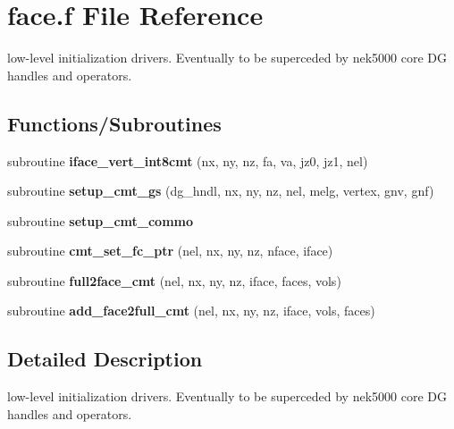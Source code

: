 \hypertarget{face_8f}{\section{face.\-f File Reference}
\label{face_8f}
}


low-\/level initialization drivers. Eventually to be superceded by nek5000 core D\-G handles and operators.  


\subsection*{Functions/\-Subroutines}
\begin{DoxyCompactItemize}
\item 
\hypertarget{face_8f_a8efaf08cb6f5e3f2d453dc8195fdedc3}{subroutine {\bfseries iface\-\_\-vert\-\_\-int8cmt} (nx, ny, nz, fa, va, jz0, jz1, nel)}\label{face_8f_a8efaf08cb6f5e3f2d453dc8195fdedc3}

\item 
\hypertarget{face_8f_ac6a7aef7d985d0dbcfccfca53c4c7fc2}{subroutine {\bfseries setup\-\_\-cmt\-\_\-gs} (dg\-\_\-hndl, nx, ny, nz, nel, melg, vertex, gnv, gnf)}\label{face_8f_ac6a7aef7d985d0dbcfccfca53c4c7fc2}

\item 
\hypertarget{face_8f_a7030c76781d497bc17d369a40670ef59}{subroutine {\bfseries setup\-\_\-cmt\-\_\-commo}}\label{face_8f_a7030c76781d497bc17d369a40670ef59}

\item 
\hypertarget{face_8f_ab10a3afa8911c08464a660346cad3c5a}{subroutine {\bfseries cmt\-\_\-set\-\_\-fc\-\_\-ptr} (nel, nx, ny, nz, nface, iface)}\label{face_8f_ab10a3afa8911c08464a660346cad3c5a}

\item 
\hypertarget{face_8f_a250af663ab54c8e8777f671b93c6c4ac}{subroutine {\bfseries full2face\-\_\-cmt} (nel, nx, ny, nz, iface, faces, vols)}\label{face_8f_a250af663ab54c8e8777f671b93c6c4ac}

\item 
\hypertarget{face_8f_a8837dacbadf0fe4f899f2768bb606deb}{subroutine {\bfseries add\-\_\-face2full\-\_\-cmt} (nel, nx, ny, nz, iface, vols, faces)}\label{face_8f_a8837dacbadf0fe4f899f2768bb606deb}

\end{DoxyCompactItemize}


\subsection{Detailed Description}
low-\/level initialization drivers. Eventually to be superceded by nek5000 core D\-G handles and operators. 